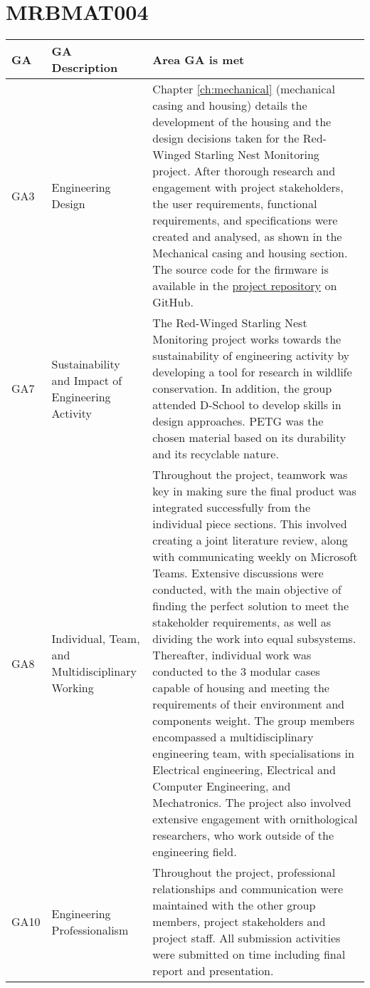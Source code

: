 \documentclass[class=report,11pt,crop=false]{standalone}
\begin{document}
\section{MRBMAT004}

\centering
\begin{tabularx}{\textwidth}{|p{} p{} X|}

    \hline
    \textbf{GA} & \textbf{GA Description} & \textbf{Area GA is met} \\ \hline

    GA3 & Engineering Design & Chapter  \ref{ch:mechanical} (mechanical casing and housing) details the development of the housing and the design decisions taken for the Red-Winged Starling Nest Monitoring project. After thorough research and engagement with project stakeholders, the user requirements, functional requirements, and specifications were created and analysed, as shown in the Mechanical casing and housing section.   The source code for the firmware is available in the \href{https://github.com/rothdu/EEE4113F-Group13-2024}{project repository} on GitHub.   \\ \hline

    GA7 & Sustainability and Impact of Engineering Activity & The Red-Winged Starling Nest Monitoring project works towards the sustainability of engineering activity by developing a tool for research in wildlife conservation.  In addition, the group attended D-School to develop skills in design approaches. PETG was the chosen material based on its durability and its recyclable nature. \\ \hline

    GA8 & Individual, Team, and Multidisciplinary Working & Throughout the project, teamwork was key in making sure the final product was integrated successfully from the individual piece sections. This involved creating a joint literature review, along with communicating weekly on Microsoft Teams. Extensive discussions were conducted, with the main objective of finding the perfect solution to meet the stakeholder requirements, as well as dividing the work into equal subsystems. Thereafter, individual work was conducted to the 3 modular cases capable of housing and meeting the requirements of their environment and components weight. The group members encompassed a multidisciplinary engineering team, with specialisations in Electrical engineering, Electrical and Computer Engineering, and Mechatronics. The project also involved extensive engagement with ornithological researchers, who work outside of the engineering field. \\ \hline

    GA10 & Engineering Professionalism & Throughout the project, professional relationships and communication were maintained with the other group members, project stakeholders and project staff. All submission activities were submitted on time including final report and presentation.  \\ \hline


\end{tabularx}
\raggedright




\ifstandalone

\printnoidxglossary[type=\acronymtype,nonumberlist]
\fi
\end{document}
